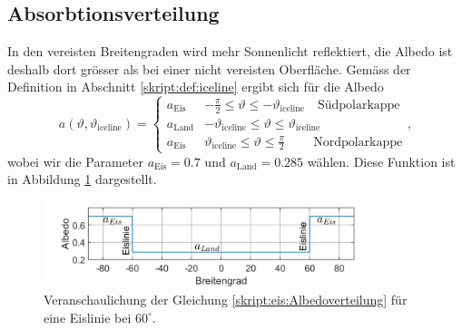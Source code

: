 \begin{refsection}
\subsection{Absorbtionsverteilung}
In den vereisten Breitengraden wird mehr Sonnenlicht reflektiert, die Albedo ist deshalb dort grösser als bei einer nicht vereisten Oberfläche. Gemäss der Definition in Abschnitt \ref{skript:def:iceline} ergibt sich für die Albedo
\begin{equation}\label{skript:eis:Albedoverteilung}
a(\vartheta,\vartheta_\text{iceline})
=
\begin{cases}
	a_\text{Eis}&-\tfrac{\pi}{2}\leq\vartheta\leq-\vartheta_\text{iceline}\quad\text{Südpolarkappe}\\
	a_\text{Land}&-\vartheta_\text{iceline}\leq\vartheta\leq\vartheta_\text{iceline} \\
	a_\text{Eis}&\vartheta_\text{iceline}\leq\vartheta\leq\tfrac{\pi}{2}\qquad\>\text{Nordpolarkappe}
\end{cases},
\end{equation}
wobei wir die Parameter $a_\text{Eis}=0.7$ und $a_\text{Land}=0.285$ wählen. Diese Funktion ist in Abbildung \ref{skript:eis:fig:Albedoverteilung} dargestellt.
\begin{figure}
	\centering
	\includegraphics[width=10cm]{eis/Albedo_abh_Breitengrad.jpg}
	\caption{Veranschaulichung der Gleichung \eqref{skript:eis:Albedoverteilung} für eine Eislinie bei $60^\circ$.}
	\label{skript:eis:fig:Albedoverteilung}
\end{figure}

\end{refsection}

